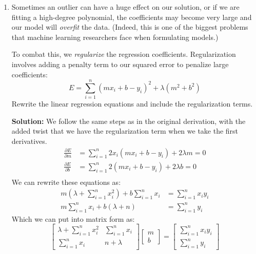 \documentclass[letterpaper, 11pt]{article}
\begin{document}
\begin{enumerate}
\item Sometimes an outlier can have a huge effect on our solution, or if we are fitting a high-degree polynomial, the coefficients may become very large and our model will \textit{overfit} the data. (Indeed, this is one of the biggest problems that machine learning researchers face when formulating models.) 
\par To combat this, we \textit{regularize} the regression coefficients. Regularization involves adding a penalty term to our squared error to penalize large coefficients:
\[ E = \sum_{i=1}^n(mx_i + b - y_i)^2 + \lambda(m^2 + b^2) \]
Rewrite the linear regression equations and include the regularization terms. 
\par \textbf{Solution:} We follow the same steps as in the original derivation, with the added twist that we have the regularization term when we take the first derivatives. 
\begin{align*}
\frac{ \partial E}{\partial m} &= \sum_{i=1}^n 2x_i(mx_i + b - y_i) + 2 \lambda m = 0\\
\frac{ \partial E}{\partial b} &= \sum_{i=1}^n 2(mx_i +b - y_i) + 2 \lambda b = 0\\
\end{align*}
We can rewrite these equations as:
\begin{align*}
m\left(\lambda +  \sum_{i=1}^n x_i^2 \right) + b \sum_{i=1}^n x_i &= \sum_{i=1}^n x_i y_i \\
m \sum_{i=1}^n x_i + b(\lambda + n) &= \sum_{i=1}^n y_i
\end{align*}
Which we can put into matrix form as:
\[ \left[ \begin{array}{cc}  \lambda + \sum_{i=1}^n x_i^2 & \sum_{i=1}^n x_i \\ \sum_{i=1}^n x_i & n + \lambda \end{array}\right] 
\left[ \begin{array}{c} m \\ b \end{array} \right] =
\left[ \begin{array}{c} \sum_{i=1}^n x_i y_i \\ \sum_{i=1}^n y_i \end{array} \right] \]


\end{enumerate}
\end{document}

